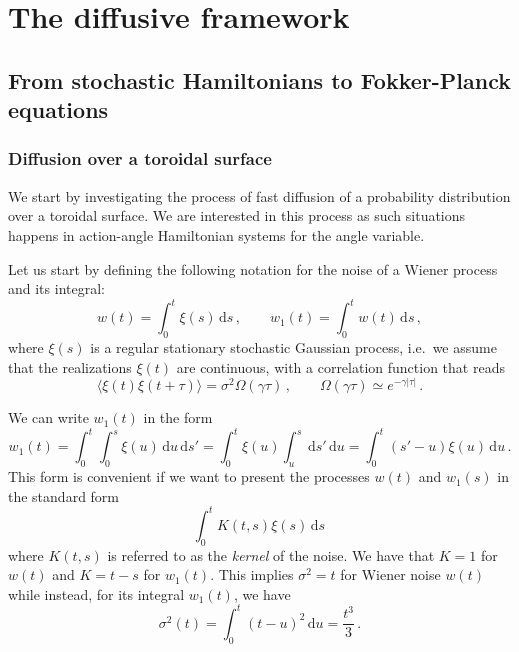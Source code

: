 
\chapter{The diffusive framework}\label{ch:the_diffusive_framework}




\section{From stochastic Hamiltonians to Fokker-Planck equations}

\subsection{Diffusion over a toroidal surface}
\label{subsec:diffusion-over-a-toroidal-surface}

We start by investigating the process of fast diffusion of a probability distribution over a toroidal surface. We are interested in this process as such situations happens in action-angle Hamiltonian systems for the angle variable.

Let us start by defining the following notation for the noise of a Wiener process and its integral:
\begin{equation}
	w(t) = \int_0^t \xi(s)\,\mathrm{d}s \,, \qquad w_1(t)=\int_0^t w(t)\,\mathrm{d}s \,,
\end{equation}
where $\xi(s)$ is a regular stationary stochastic Gaussian process, i.e.\ we assume that the realizations $\xi(t)$ are continuous, with a correlation function that reads
\begin{equation}
    \langle\xi(t)\xi(t+\tau)\rangle = \sigma^2 \Omega(\gamma\tau) \,,\qquad \Omega(\gamma\tau) \simeq e^{-\gamma|\tau|}\,.
\end{equation}

We can write \(w_1(t)\) in the form
\begin{equation}
	w_1(t) = \int_0^t \int_0^s \xi(u)\,\mathrm{d}u\,\mathrm{d}s' = \int_0^t \xi(u)\int_u^s\,\mathrm{d}s'\,\mathrm{d}u = \int_0^t (s'-u)\xi(u)\,\mathrm{d}u \,.
\end{equation}
This form is convenient if we want to present the processes \(w(t)\) and \(w_1(s)\) in the standard form 
\begin{equation}
	\int_0^t K(t,s)\xi(s)\,\mathrm{d}s \,
\end{equation}
where \(K(t,s)\) is referred to as the \textit{kernel} of the noise. We have that \(K=1\) for \(w(t)\) and \(K=t-s\) for \(w_1(t)\). This implies \(\sigma^2 = t\) for Wiener noise \(w(t)\) while instead, for its integral \(w_1(t)\), we have
\begin{equation}
	\sigma^2(t) = \int_0^t (t-u)^2\,\mathrm{d}u = \frac{t^3}{3} \,.
\end{equation}


